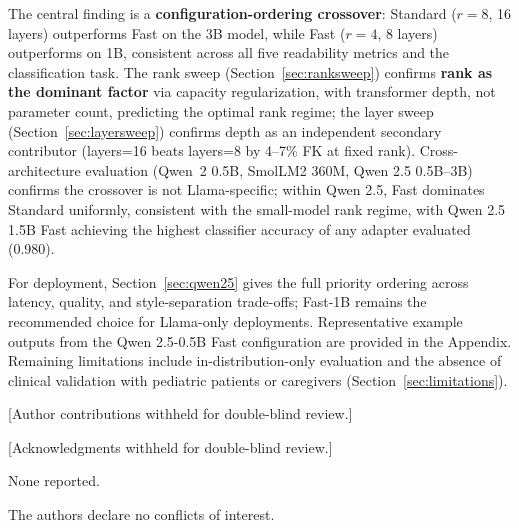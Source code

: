 \documentclass[ASNA,twocolumn]{USG} %
\begin{document}
The central finding is a \textbf{configuration-ordering crossover}: Standard ($r=8$, 16 layers) outperforms Fast on the 3B model, while Fast ($r=4$, 8 layers) outperforms on 1B, consistent across all five readability metrics and the classification task. The rank sweep (Section~\ref{sec:ranksweep}) confirms \textbf{rank as the dominant factor} via capacity regularization, with transformer depth, not parameter count, predicting the optimal rank regime; the layer sweep (Section~\ref{sec:layersweep}) confirms depth as an independent secondary contributor (layers=16 beats layers=8 by 4--7\% FK at fixed rank). Cross-architecture evaluation (Qwen~2 0.5B, SmolLM2 360M, Qwen 2.5 0.5B--3B) confirms the crossover is not Llama-specific; within Qwen 2.5, Fast dominates Standard uniformly, consistent with the small-model rank regime, with Qwen 2.5 1.5B Fast achieving the highest classifier accuracy of any adapter evaluated (0.980).

For deployment, Section~\ref{sec:qwen25} gives the full priority ordering across latency, quality, and style-separation trade-offs; Fast-1B remains the recommended choice for Llama-only deployments. Representative example outputs from the Qwen 2.5-0.5B Fast configuration are provided in the Appendix. Remaining limitations include in-distribution-only evaluation and the absence of clinical validation with pediatric patients or caregivers (Section~\ref{sec:limitations}).


{}

[Author contributions withheld for double-blind review.]

[Acknowledgments withheld for double-blind review.]


None reported.


The authors declare no conflicts of interest.

%
\end{document}
